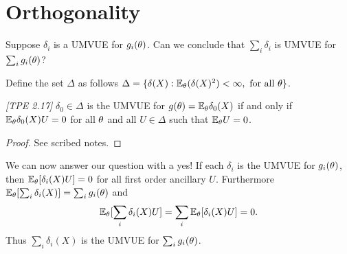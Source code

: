 \section{Orthogonality}
Suppose $\delta_i$ is a UMVUE for $g_i({\theta})$. Can we conclude that $\sum_i \delta_i$ is UMVUE for $\sum_i g_i({\theta})$?

\begin{defn}
    Define the set $\Delta$ as follows $\Delta = \{\delta(X) : {\mathbb{E}}_{\theta}(\delta(X)^2) < \infty, \text{ for all } {\theta} \}$.
\end{defn}

\begin{thrm}
    \emph{[TPE 2.17]}
    $\delta_0 \in \Delta$ is the UMVUE for $g({\theta}) = {\mathbb{E}}_{\theta} \delta_0(X)$ if and only if ${\mathbb{E}}_{\theta} \delta_0(X)U = 0$ for all ${\theta}$ and all $U \in \Delta$ such that ${\mathbb{E}}_{\theta} U = 0$.
\end{thrm}
\begin{proof}
    See scribed notes.
\end{proof}
We can now answer our question with a yes! If each $\delta_i$ is the UMVUE for $g_i({\theta})$, then ${\mathbb{E}}_{\theta}[\delta_i(X)U] = 0$ for all first order ancillary $U$. Furthermore ${\mathbb{E}}_{\theta}[\sum_i \delta_i(X)] =\sum_i g_i({\theta})$ and \[{\mathbb{E}}_{\theta}[\sum_i \delta_i(X)U] = \sum_i {\mathbb{E}}_{\theta} [\delta_i(X)U]=0.\] Thus $\sum_i \delta_i(X)$ is the UMVUE for $\sum_i g_i({\theta})$.

